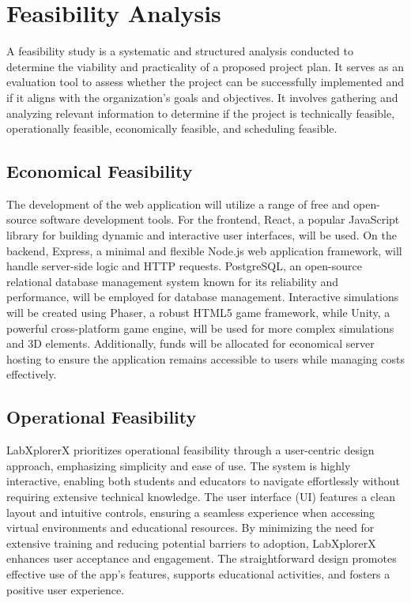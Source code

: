 \section{Feasibility Analysis}
A feasibility study is a systematic and structured analysis conducted to determine the viability and practicality of a proposed project plan. It serves as an evaluation tool to assess whether the project can be successfully implemented and if it aligns with the organization's goals and objectives. It involves gathering and analyzing relevant information to determine if the project is technically feasible, operationally feasible, economically feasible, and scheduling feasible.
\subsection{Economical Feasibility}
The development of the web application will utilize a range of free and open-source software development tools. For the frontend, React, a popular JavaScript library for building dynamic and interactive user interfaces, will be used. On the backend, Express, a minimal and flexible Node.js web application framework, will handle server-side logic and HTTP requests. PostgreSQL, an open-source relational database management system known for its reliability and performance, will be employed for database management. Interactive simulations will be created using Phaser, a robust HTML5 game framework, while Unity, a powerful cross-platform game engine, will be used for more complex simulations and 3D elements. Additionally, funds will be allocated for economical server hosting to ensure the application remains accessible to users while managing costs effectively.
\subsection{Operational Feasibility}
LabXplorerX prioritizes operational feasibility through a user-centric design approach, emphasizing simplicity and ease of use. The system is highly interactive, enabling both students and educators to navigate effortlessly without requiring extensive technical knowledge. The user interface (UI) features a clean layout and intuitive controls, ensuring a seamless experience when accessing virtual environments and educational resources. By minimizing the need for extensive training and reducing potential barriers to adoption, LabXplorerX enhances user acceptance and engagement. The straightforward design promotes effective use of the app's features, supports educational activities, and fosters a positive user experience.
